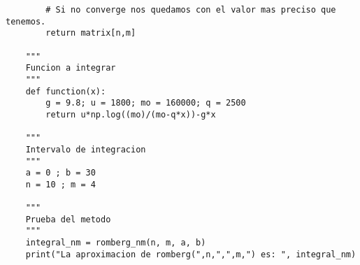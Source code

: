 \begin{lstlisting}
        # Si no converge nos quedamos con el valor mas preciso que tenemos.
        return matrix[n,m]
    
    """
    Funcion a integrar
    """
    def function(x):
        g = 9.8; u = 1800; mo = 160000; q = 2500
        return u*np.log((mo)/(mo-q*x))-g*x
    
    """
    Intervalo de integracion
    """
    a = 0 ; b = 30
    n = 10 ; m = 4
    
    """
    Prueba del metodo
    """
    integral_nm = romberg_nm(n, m, a, b)
    print("La aproximacion de romberg(",n,",",m,") es: ", integral_nm)
\end{lstlisting}


 